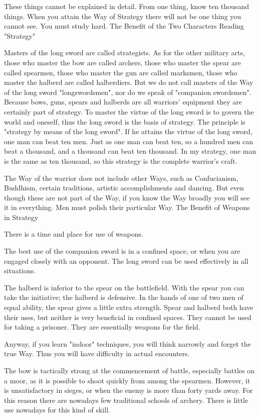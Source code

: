 These things cannot be explained in detail. From one thing, know ten thousand things. When you attain the Way of Strategy there will not be one thing you cannot see. You must study hard.
The Benefit of the Two Characters Reading "Strategy"

Masters of the long sword are called strategists. As for the other military arts, those who master the bow are called archers, those who master the spear are called spearmen, those who master the gun are called marksmen, those who master the halberd are called halberdiers. But we do not call masters of the Way of the long sword "longswordsmen", nor do we speak of "companion swordsmen". Because bows, guns, spears and halberds are all warriors' equipment they are certainly part of strategy. To master the virtue of the long sword is to govern the world and oneself, thus the long sword is the basis of strategy. The principle is "strategy by means of the long sword". If he attains the virtue of the long sword, one man can beat ten men. Just as one man can beat ten, so a hundred men can beat a thousand, and a thousand can beat ten thousand. In my strategy, one man is the same as ten thousand, so this strategy is the complete warrior's craft.

The Way of the warrior does not include other Ways, such as Confucianism, Buddhism, certain traditions, artistic accomplishments and dancing. But even though these are not part of the Way, if you know the Way broadly you will see it in everything. Men must polish their particular Way.
The Benefit of Weapons in Strategy

There is a time and place for use of weapons.

The best use of the companion sword is in a confined space, or when you are engaged closely with an opponent. The long sword can be used effectively in all situations.

The halberd is inferior to the spear on the battlefield. With the spear you can take the initiative; the halberd is defensive. In the hands of one of two men of equal ability, the spear gives a little extra strength. Spear and halberd both have their uses, but neither is very beneficial in confined spaces. They cannot be used for taking a prisoner. They are essentially weapons for the field.

Anyway, if you learn "indoor" techniques, you will think narrowly and forget the true Way. Thus you will have difficulty in actual encounters.

The bow is tactically strong at the commencement of battle, especially battles on a moor, as it is possible to shoot quickly from among the spearmen. However, it is unsatisfactory in sieges, or when the enemy is more than forty yards away. For this reason there are nowadays few traditional schools of archery. There is little use nowadays for this kind of skill.

